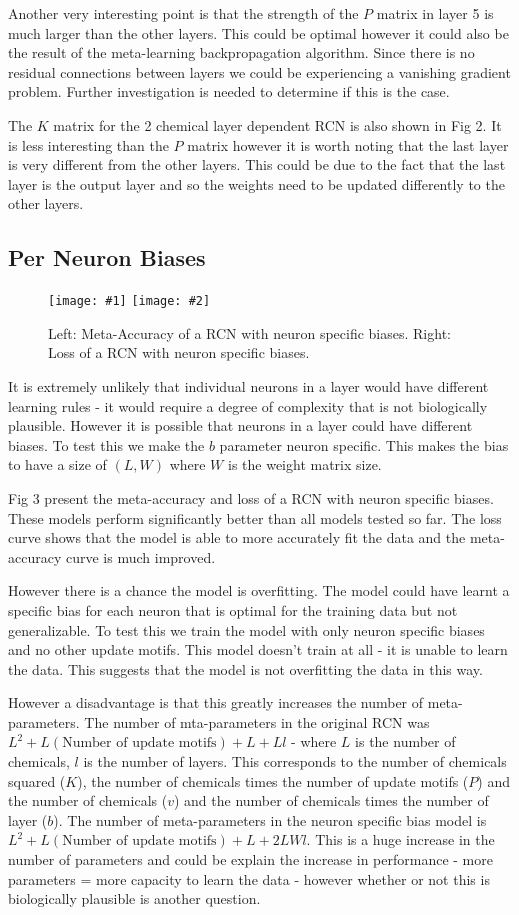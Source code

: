 \documentclass[a4paper, 11pt, oneside]{report}
\newcommand{\centreImageTwo}[3]{
    \begin{figure}[H]
        \centering
        \texttt{[image: \#1]}
        \texttt{[image: \#2]}
        \caption{#3}
        \label{fig:#1}
    \end{figure}
}
\begin{document}
Another very interesting point is that the strength of the $P$ matrix in layer 5 is much larger than the other layers.
This could be optimal however it could also be the result of the meta-learning backpropagation algorithm. Since 
there is no residual connections between layers we could be experiencing a vanishing gradient problem. Further 
investigation is needed to determine if this is the case.

The $K$ matrix for the 2 chemical layer dependent RCN is also shown in Fig 2. It is less interesting than the $P$ matrix however it is worth noting that
the last layer is very different from the other layers. This could be due to the fact that the last layer is the output layer and so the weights need
to be updated differently to the other layers.

\subsection*{Per Neuron Biases}

\centreImageTwo{bias_2.png}{bias_loss.png}{Left: Meta-Accuracy of a RCN with neuron specific biases. Right: Loss of a RCN with neuron specific biases.}

It is extremely unlikely that individual neurons in a layer would have different learning rules -
it would require a degree of complexity that is not biologically plausible. However it is possible that
neurons in a layer could have different biases. To test this we make the $b$ parameter neuron specific.
This makes the bias to have a size of $(L,W)$ where $W$ is the weight matrix size.

Fig 3 present the meta-accuracy and loss of a RCN with neuron specific biases.
These models perform significantly better than all models tested so far. The loss curve shows that 
the model is able to more accurately fit the data and the meta-accuracy curve is much improved.

However there is a chance the model is overfitting. The model could have learnt a specific bias 
for each neuron that is optimal for the training data but not generalizable. To test this we
train the model with only neuron specific biases and no other update motifs. This model doesn't
train at all - it is unable to learn the data. This suggests that the model is not overfitting
the data in this way.

However a disadvantage is that this greatly increases the number of meta-parameters. The number of mta-parameters
in the original RCN was $L^2 + L(\text{Number of update motifs}) + L + Ll$ - where $L$ is the number of chemicals, $l$ is the number of layers.
This corresponds to the number of chemicals squared ($K$), the number of chemicals times the number of update motifs ($P$) and the number of chemicals ($v$) and the number of chemicals times the number of layer ($b$).
The number of meta-parameters in the neuron specific bias model is $L^2 + L(\text{Number of update motifs}) + L + 2LWl$.
This is a huge increase in the number of parameters and could be explain the increase in performance - more parameters
= more capacity to learn the data - however whether or not this is biologically plausible is another question.
\end{document}
